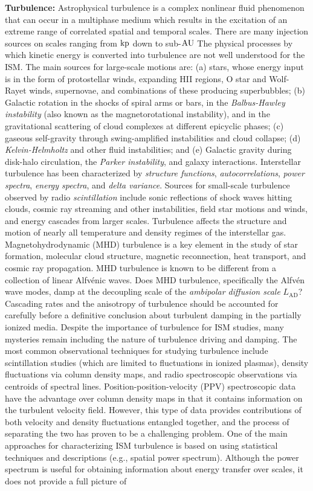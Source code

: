 \documentclass[a4paper,11pt]{article}
\begin{document}
{\noindent}\textbf{Turbulence:} Astrophysical turbulence is a complex nonlinear fluid phenomenon that can occur in a multiphase medium which results in the excitation of an extreme range of correlated spatial and temporal scales. There are many injection sources on scales ranging from ${\rm kp}$ down to sub-${\rm AU}$ The physical processes by which kinetic energy is converted into turbulence are not well understood for the ISM. The main sources for large-scale motions are: (a) stars, whose energy input is in the form of protostellar winds, expanding HII regions, O star and Wolf-Rayet winds, supernovae, and combinations of these producing superbubbles; (b) Galactic rotation in the shocks of spiral arms or bars, in the \textit{Balbus-Hawley instability} (also known as the magnetorotational instability), and in the gravitational scattering of cloud complexes at different epicyclic phases; (c) gaseous self-gravity through swing-amplified instabilities and cloud collapse; (d) \textit{Kelvin-Helmholtz} and other fluid instabilities; and (e) Galactic gravity during disk-halo circulation, the \textit{Parker instability}, and galaxy interactions. Interstellar turbulence has been characterized by \textit{structure functions}, \textit{autocorrelations}, \textit{power spectra}, \textit{energy spectra}, and \textit{delta variance}. Sources for small-scale turbulence observed by radio \textit{scintillation} include sonic reflections of shock waves hitting clouds, cosmic ray streaming and other instabilities, field star motions and winds, and energy cascades from larger scales. Turbulence affects the structure and motion of nearly all temperature and density regimes of the interstellar gas. Magnetohydrodynamic (MHD) turbulence is a key element in the study of star formation, molecular cloud structure, magnetic reconnection, heat transport, and cosmic ray propagation. MHD turbulence is known to be different from a collection of linear Alfv\'enic waves. Does MHD turbulence, specifically the Alfv\'en wave modes, damp at the decoupling scale of the \textit{ambipolar diffusion scale} $L_\mathrm{AD}$? Cascading rates and the anisotropy of turbulence should be accounted for carefully before a definitive conclusion about turbulent damping in the partially ionized media. Despite the importance of turbulence for ISM studies, many mysteries remain including the nature of turbulence driving and damping. The most common observational techniques for studying turbulence include scintillation studies (which are limited to fluctuations in ionized plasmas), density fluctuations via column density maps, and radio spectroscopic observations via centroids of spectral lines. Position-position-velocity (PPV) spectroscopic data have the advantage over column density maps in that it contains information on the turbulent velocity field. However, this type of data provides contributions of both velocity and density fluctuations entangled together, and the process of separating the two has proven to be a challenging problem. One of the main approaches for characterizing ISM turbulence is based on using statistical techniques and descriptions (e.g., spatial power spectrum). Although the power spectrum is useful for obtaining information about energy transfer over scales, it does not provide a full picture of 
\end{document}
